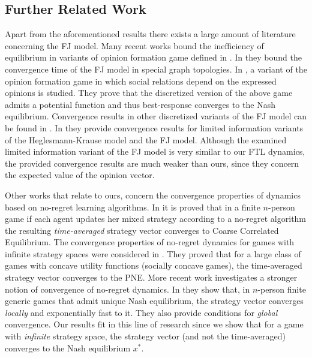 \subsection{Further Related Work}

Apart from the aforementioned results there exists a large amount of literature
concerning the FJ model.  Many recent works \cite{BGM13,CKO13,BFM16,EFHS17}
bound the inefficiency of equilibrium in variants of opinion formation game
defined in \cite{BKO11}. In \cite{GS14} they bound the convergence time of the
FJ model in special graph topologies.  In \cite{BFM16}, a variant of the
opinion formation game in which social relations depend on the expressed
opinions is studied.  They prove that the discretized version of the above game
admits a potential function and thus best-response converges to the Nash
equilibrium. Convergence results in other discretized variants of the FJ model
can be found in \cite{YOASS13,FGV16}. In \cite{FPS16} they provide convergence
results for limited information variants of the Heglesmann-Krause model
\cite{HK} and the FJ model. Although the examined limited information variant
of the FJ model is very similar to our FTL dynamics, the provided convergence
results are much weaker than ours, since they concern the expected value of the
opinion vector.

Other works that relate to ours, concern the convergence properties of dynamics
based on no-regret learning algorithms.  In \cite{FV97,FS99,SA00,SALS15} it is
proved that in a finite $n$-person game if each agent updates her mixed
strategy according to a no-regret algorithm the resulting \emph{time-averaged}
strategy vector converges to Coarse Correlated Equilibrium. The convergence
properties of no-regret dynamics for games with infinite strategy spaces were
considered in \cite{EMN09}.  They proved that for a large class of games with
concave utility functions (socially concave games), the time-averaged strategy
vector converges to the PNE. More recent work investigates a stronger notion of
convergence of no-regret dynamics. In \cite{CHM17} they show that, in
$n$-person finite generic games that admit unique Nash equilibrium, the
strategy vector converges \emph{locally} and exponentially fast to it. They
also provide conditions for \emph{global} convergence.  Our results fit in this
line of research since we show that for a game with \emph{infinite} strategy
space, the strategy vector (and not the time-averaged) converges to the Nash
equilibrium $x^*$.

